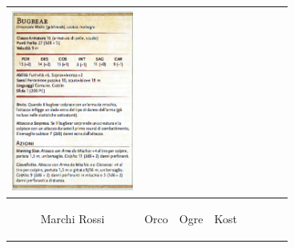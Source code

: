 \documentclass{article}
\begin{document}
\begin{table}
\begin{tabular}{cr|cr|cr|cr}
            \includegraphics[width=4cm,height = 6cm]{../Mostri/Bugbear.png}\\
              \hline
            \hypertarget{marchirossi}{Marchi Rossi} & \hypertarget{orco}{Orco} & \hypertarget{ogre}{Ogre}&\hypertarget{kost}{Kost}\\

\end{tabular}
\end{table}
\end{document}
